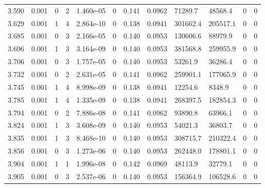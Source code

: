 \documentclass[preview]{standalone}
\begin{document}
{{{{{\begin{tabular}{L{1.2cm}C{1.2cm} C{0.3cm}C{0.5cm} C{1.4cm}C{1.4cm} C{1.4cm}C{1.4cm} C{1.6cm}C{1.6cm} C{1.6cm}C{1.6cm}}
  3.590  &  0.001  & 0     &  2 &  1.460e-05  & 0  &  0.141&   0.0962& 71289.7 & 48568.4   &  0 & 0  \\ 
  3.629  &  0.001  & 1     &  4 &  2.864e-10  & 0  &  0.138&   0.0941& 301662.4 & 205517.1   &  0 & 0  \\ 
  3.685  &  0.001  & 0     &  3 &  2.166e-05  & 0  &  0.140&   0.0953& 130606.6 & 88979.9   &  0 & 0  \\ 
  3.696  &  0.001  & 1     &  3 &  3.164e-09  & 0  &  0.140&   0.0953& 381568.8 & 259955.9   &  0 & 0  \\ 
  3.706  &  0.001  & 0     &  3 &  1.757e-05  & 0  &  0.140&   0.0953& 53261.9 & 36286.4   &  0 & 0  \\ 
  3.732  &  0.001  & 0     &  2 &  2.631e-05  & 0  &  0.141&   0.0962& 259901.1 & 177065.9   &  0 & 0  \\ 
  3.745  &  0.001  & 1     &  4 &  8.998e-09  & 0  &  0.138&   0.0941& 12254.6 & 8348.9   &  0 & 0  \\ 
  3.785  &  0.001  & 1     &  4 &  1.335e-09  & 0  &  0.138&   0.0941& 268397.5 & 182854.3   &  0 & 0  \\ 
  3.794  &  0.001  & 0     &  2 &  7.886e-08  & 0  &  0.141&   0.0962& 93890.8 & 63966.1   &  0 & 0  \\ 
  3.824  &  0.001  & 1     &  3 &  3.608e-09  & 0  &  0.140&   0.0953& 54021.3 & 36803.7   &  0 & 0  \\ 
  3.835  &  0.001  & 1     &  3 &  8.468e-10  & 0  &  0.140&   0.0953& 308715.7 & 210322.4   &  0 & 0  \\ 
  3.856  &  0.001  & 0     &  3 &  1.273e-06  & 0  &  0.140&   0.0953& 262448.0 & 178801.1   &  0 & 0  \\ 
  3.904  &  0.001  & 1     &  1 &  1.996e-08  & 0  &  0.142&   0.0969& 48113.9 & 32779.1   &  0 & 0  \\ 
  3.905  &  0.001  & 0     &  3 &  2.537e-06  & 0  &  0.140&   0.0953& 156364.9 & 106528.6   &  0 & 0  \\ 
\hline 
\end{tabular} 

}}}}}
\end{document}
